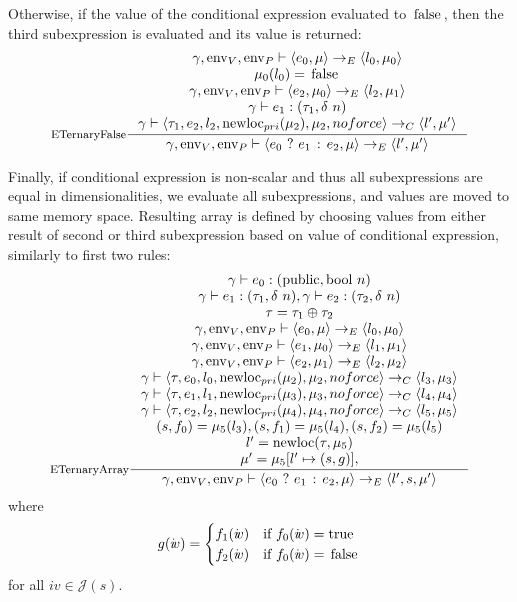 \documentclass[a4paper, 10pt, draft]{report}
\DeclareMathOperator*{\env}{env}
\DeclareMathOperator*{\newloc}{newloc}
\newcommand{\mycode}[1]{\ensuremath{\mbox{\lstinline{#1}}}}
\begin{document}
Otherwise, if the value of the conditional expression evaluated to
\mycode{false}, then the third subexpression is evaluated and its value is
returned:
\[\inference[ETernaryFalse]{
  \gamma, \env_V, \env_P |- \left<e_0, \mu \right> \to_E \left< l_0, \mu_0 \right> \\
  \mu_0(l_0) = \mycode{false}\\
  \gamma, \env_V, \env_P |- \left< e_2, \mu_0 \right> \to_E \left< l_2, \mu_1 \right> \\
  \gamma |- e_1 : \left( \tau_1, \delta \ n \right) \\
  \gamma |- \left< \tau_1, e_2, l_2, \newloc_{pri}(\mu_2), \mu_2, noforce \right> \to_C \left< l', \mu' \right>
}{
  \gamma, \env_V, \env_P |- \left< e_0\ \mycode{?}\ e_1\ \mycode{:}\ e_2, \mu \right> \to_E \left< l', \mu' \right>
}\]

Finally, if conditional expression is non-scalar and thus all subexpressions
are equal in dimensionalities, we evaluate all subexpressions, and values are
moved to same memory space. Resulting array is defined by choosing values from
either result of second or third subexpression based on value of conditional
expression, similarly to first two rules:
\[ \inference[ETernaryArray]{
  \gamma |- e_0 : (\mycode{public}, \mycode{bool}\ n) \\
    \gamma |- e_1 : (\tau_1, \delta\ n), \gamma |- e_2 : (\tau_2, \delta\ n) \\
    \tau = \tau_1 \oplus \tau_2 \\
    \gamma, \env_V, \env_P |- \left<e_0, \mu   \right> \to_E \left< l_0, \mu_0 \right> \\
    \gamma, \env_V, \env_P |- \left<e_1, \mu_0 \right> \to_E \left< l_1, \mu_1 \right> \\
    \gamma, \env_V, \env_P |- \left<e_2, \mu_1 \right> \to_E \left< l_2, \mu_2 \right> \\
    \gamma |- \left< \tau , e_0, l_0, \newloc_{pri}(\mu_2), \mu_2 , noforce \right> \to_C \left< l_3, \mu_3 \right> \\
    \gamma |- \left< \tau , e_1, l_1, \newloc_{pri}(\mu_3), \mu_3 , noforce \right> \to_C \left< l_4, \mu_4 \right> \\
    \gamma |- \left< \tau , e_2, l_2, \newloc_{pri}(\mu_4), \mu_4 , noforce \right> \to_C \left< l_5, \mu_5 \right> \\
    (s, f_0) = \mu_5(l_3), (s, f_1) = \mu_5(l_4), (s,f_2) = \mu_5(l_5) \\
    l' = \newloc(\tau, \mu_5) \\
    \mu' = \mu_5[l' \mapsto (s, g)],
}{
  \gamma, \env_V, \env_P |- \left< e_0\ \mycode{?}\ e_1\ \mycode{:}\ e_2, \mu \right> \to_E \left< l', s, \mu' \right>
}\]
where \[
g(i\!v) = \begin{cases}
f_1(i\!v) & \text{if}\ f_0(i\!v) = \mycode{true} \\
f_2(i\!v) & \text{if}\ f_0(i\!v) = \mycode{false}
\end{cases}
\] for all $ i\!v \in \mathcal{J}(s)$.
\vspace{0.5cm}
\end{document}
